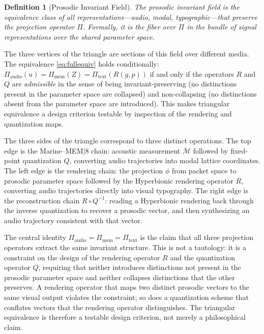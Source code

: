 \documentclass[12pt, a4paper]{article}
\newtheorem{definition}{Definition}
\begin{document}
\begin{definition}[Prosodic Invariant Field]
The \emph{prosodic invariant field} is the equivalence class of all representations---audio, modal, typographic---that preserve the projection operator $\Pi$. Formally, it is the fiber over $\Pi$ in the bundle of signal representations over the shared parameter space.
\end{definition}

The three vertices of the triangle are sections of this field over different media. The equivalence \eqref{eq:fullequiv} holds conditionally: $\Pi_{\mathrm{audio}}(u) = \Pi_{\mathrm{mem}}(Z) = \Pi_{\mathrm{text}}(R(g,p))$ if and only if the operators $R$ and $Q$ are \emph{admissible} in the sense of being invariant-preserving (no distinctions present in the parameter space are collapsed) and non-collapsing (no distinctions absent from the parameter space are introduced). This makes triangular equivalence a design criterion testable by inspection of the rendering and quantization maps.

The three sides of the triangle correspond to three distinct operations. The top edge is the Marine--MEM$|$8 chain: acoustic measurement $\mathcal{M}$ followed by fixed-point quantization $Q$, converting audio trajectories into modal lattice coordinates. The left edge is the rendering chain: the projection $\phi$ from packet space to prosodic parameter space followed by the Hyperbionic rendering operator $R$, converting audio trajectories directly into visual typography. The right edge is the reconstruction chain $R \circ Q^{-1}$: reading a Hyperbionic rendering back through the inverse quantization to recover a prosodic vector, and then synthesizing an audio trajectory consistent with that vector.

The central identity $\Pi_{\mathrm{audio}} = \Pi_{\mathrm{mem}} = \Pi_{\mathrm{text}}$ is the claim that all three projection operators extract the same invariant structure. This is not a tautology: it is a constraint on the design of the rendering operator $R$ and the quantization operator $Q$, requiring that neither introduces distinctions not present in the prosodic parameter space and neither collapses distinctions that the other preserves. A rendering operator that maps two distinct prosodic vectors to the same visual output violates the constraint; so does a quantization scheme that conflates vectors that the rendering operator distinguishes. The triangular equivalence is therefore a testable design criterion, not merely a philosophical claim.
\end{document}
